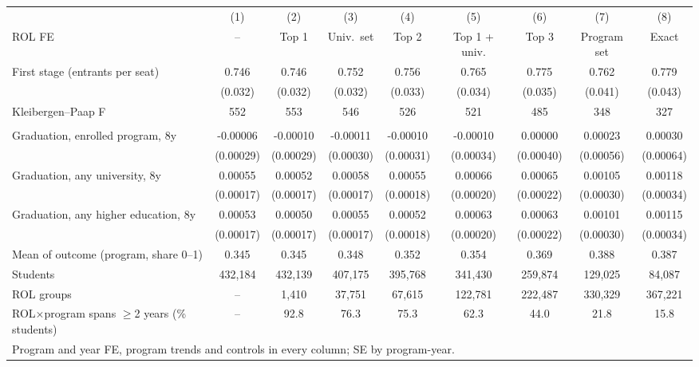 \begin{tabular}{l*{8}{c}}
\toprule
  & (1) & (2) & (3) & (4) & (5) & (6) & (7) & (8) \\
ROL FE & -- & Top 1 & Univ.\ set & Top 2 & Top 1 + univ. & Top 3 & Program set & Exact \\
\midrule
First stage (entrants per seat) &  0.746\sym{***} &  0.746\sym{***} &  0.752\sym{***} &  0.756\sym{***} &  0.765\sym{***} &  0.775\sym{***} &  0.762\sym{***} &  0.779\sym{***} \\
 & (0.032) & (0.032) & (0.032) & (0.033) & (0.034) & (0.035) & (0.041) & (0.043) \\
Kleibergen--Paap F &    552 &    553 &    546 &    526 &    521 &    485 &    348 &    327 \\
\addlinespace
\multicolumn{9}{l}{2SLS: effect of one more entrant (probability; 0.001 = 0.1 pp)} \\
\quad Graduation, enrolled program, 8y & -0.00006 & -0.00010 & -0.00011 & -0.00010 & -0.00010 &  0.00000 &  0.00023 &  0.00030 \\
 & (0.00029) & (0.00029) & (0.00030) & (0.00031) & (0.00034) & (0.00040) & (0.00056) & (0.00064) \\
\quad Graduation, any university, 8y &  0.00055\sym{***} &  0.00052\sym{***} &  0.00058\sym{***} &  0.00055\sym{***} &  0.00066\sym{***} &  0.00065\sym{***} &  0.00105\sym{***} &  0.00118\sym{***} \\
 & (0.00017) & (0.00017) & (0.00017) & (0.00018) & (0.00020) & (0.00022) & (0.00030) & (0.00034) \\
\quad Graduation, any higher education, 8y &  0.00053\sym{***} &  0.00050\sym{***} &  0.00055\sym{***} &  0.00052\sym{***} &  0.00063\sym{***} &  0.00063\sym{***} &  0.00101\sym{***} &  0.00115\sym{***} \\
 & (0.00017) & (0.00017) & (0.00017) & (0.00018) & (0.00020) & (0.00022) & (0.00030) & (0.00034) \\
\addlinespace
Mean of outcome (program, share 0--1) & 0.345 & 0.345 & 0.348 & 0.352 & 0.354 & 0.369 & 0.388 & 0.387 \\
Students &   432,184 &   432,139 &   407,175 &   395,768 &   341,430 &   259,874 &   129,025 &    84,087 \\
ROL groups & -- &     1,410 &    37,751 &    67,615 &   122,781 &   222,487 &   330,329 &   367,221 \\
ROL\(\times\)program spans \(\geq\)2 years (\% students) & -- &  92.8 &  76.3 &  75.3 &  62.3 &  44.0 &  21.8 &  15.8 \\
\midrule
\multicolumn{9}{l}{Program and year FE, program trends and controls in every column; SE by program-year.} \\
\bottomrule
\end{tabular}
